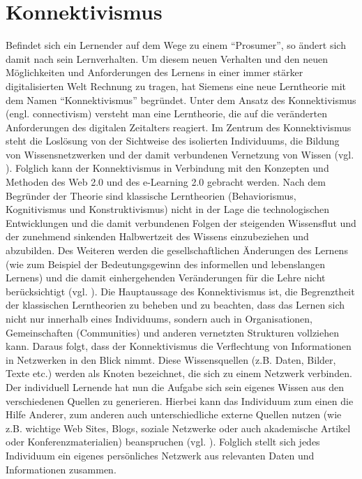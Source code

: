 \section{Konnektivismus}\label{section:konnektivismus}
Befindet sich ein Lernender auf dem Wege zu einem "`Prosumer"', so ändert sich damit nach \cite{Schaffert2008a} sein Lernverhalten. Um diesem neuen Verhalten und den neuen Möglichkeiten und Anforderungen des Lernens in einer immer stärker digitalisierten Welt Rechnung zu tragen, hat Siemens eine neue Lerntheorie mit dem Namen "`Konnektivismus"' begründet. Unter dem Ansatz des Konnektivismus (engl. connectivism) versteht man eine Lerntheorie, die auf die veränderten Anforderungen des digitalen Zeitalters reagiert. Im Zentrum des Konnektivismus steht die Loslösung von der Sichtweise des isolierten Individuums, die Bildung von Wissensnetzwerken und der damit verbundenen Vernetzung von Wissen (vgl. \cite{Siemens2004}). Folglich kann der Konnektivismus in Verbindung mit den Konzepten und Methoden des Web 2.0 und des e-Learning 2.0 gebracht werden.
Nach dem Begründer der Theorie sind klassische Lerntheorien (Behaviorismus, Kognitivismus und Konstruktivismus) nicht in der Lage die technologischen Entwicklungen und die damit verbundenen Folgen der steigenden Wissensflut und der zunehmend sinkenden Halbwertzeit des Wissens einzubeziehen und abzubilden. Des Weiteren werden die gesellschaftlichen Änderungen des Lernens (wie zum Beispiel der Bedeutungsgewinn des informellen und lebenslangen Lernens) und die damit einhergehenden Veränderungen für die Lehre nicht berücksichtigt (vgl. \cite{Siemens2004}).
Die Hauptaussage des Konnektivismus ist, die Begrenztheit der klassischen Lerntheorien zu beheben und zu beachten, dass das Lernen sich nicht nur innerhalb eines Individuums, sondern auch in Organisationen, Gemeinschaften (Communities) und anderen vernetzten Strukturen vollziehen kann. Daraus folgt, dass der Konnektivismus die Verflechtung von Informationen in Netzwerken in den Blick nimmt. Diese Wissensquellen (z.B. Daten, Bilder, Texte etc.) werden als Knoten bezeichnet, die sich zu einem Netzwerk verbinden. Der individuell Lernende hat nun die Aufgabe sich sein eigenes Wissen aus den verschiedenen Quellen zu generieren. Hierbei kann das Individuum zum einen die Hilfe Anderer, zum anderen auch unterschiedliche externe Quellen nutzen (wie z.B. wichtige Web Sites, Blogs, soziale Netzwerke oder auch akademische Artikel oder Konferenzmaterialien) beanspruchen (vgl. \cite{Siemens2004}). Folglich stellt sich jedes Individuum ein eigenes persönliches Netzwerk aus relevanten Daten und Informationen zusammen. 

